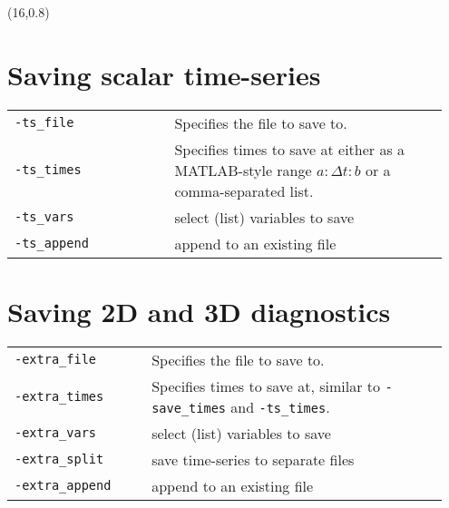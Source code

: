 \documentclass[landscape]{article}
\begin{document}
\begin{textblock}{15}(16,0.8)

\section{Saving scalar time-series}
\begin{tabular}{@{}p{0.35\linewidth}p{0.6\linewidth}@{}}
  \texttt{-ts_file} & Specifies the file to save to.\\
  \texttt{-ts_times} & Specifies times to save at either as a MATLAB-style range $a:\Delta t:b$ or a comma-separated list. \\
  \texttt{-ts_vars} & select (list) variables to save\\
  \texttt{-ts_append} & append to an existing file\\
\end{tabular}

\section{Saving 2D and 3D diagnostics}
\label{sec:extras}
\begin{tabular}{@{}p{0.3\linewidth}p{0.65\linewidth}@{}}
\texttt{-extra_file} & Specifies the file to save to.\\
\texttt{-extra_times} & Specifies times to save at, similar to
\texttt{-save_times} and \mbox{\texttt{-ts_times}}. \\
\texttt{-extra_vars} & select (list) variables to save\\
\texttt{-extra_split} & save time-series to separate files\\
\texttt{-extra_append} & append to an existing file\\
\end{tabular}



\end{textblock}
\end{document}

